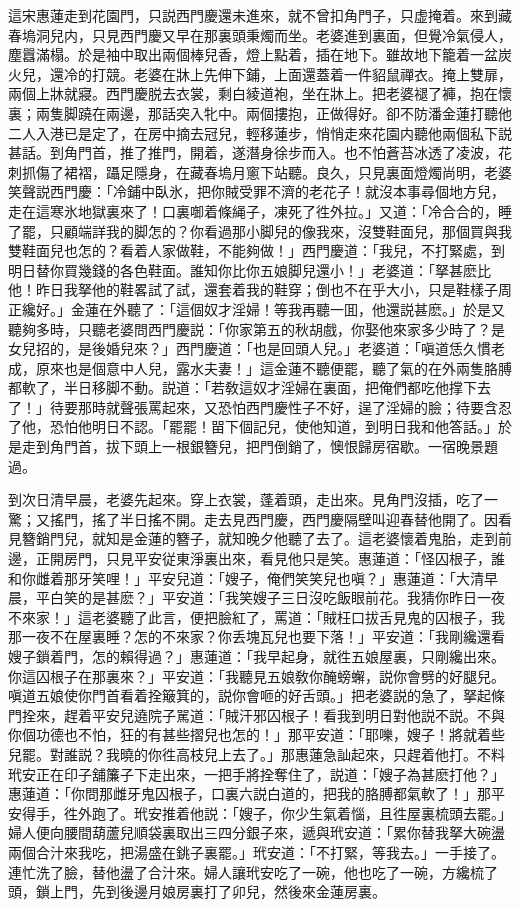 這宋惠蓮走到花園門，只説西門慶還未進來，就不曾扣角門子，只虚掩着。來到藏春塢洞兒内，只見西門慶又早在那裏頭秉燭而坐。老婆進到裏面，但覺冷氣侵人，塵囂滿榻。於是袖中取出兩個棒兒香，燈上點着，插在地下。雖故地下籠着一盆炭火兒，還冷的打競。老婆在牀上先伸下鋪，上面還蓋着一件貂鼠禪衣。掩上雙扉，兩個上牀就寢。西門慶脱去衣裳，剩白綾道袍，坐在牀上。把老婆褪了褲，抱在懷裏；兩隻脚蹺在兩邊，那話突入牝中。兩個摟抱，正做得好。卻不防潘金蓮打聽他二人入港已是定了，在房中摘去冠兒，輕移蓮步，悄悄走來花園内聽他兩個私下説甚話。到角門首，推了推門，開着，遂潛身徐步而入。也不怕蒼苔冰透了凌波，花刺抓傷了裙褶，躡足隱身，在藏春塢月窻下站聽。良久，只見裏面燈燭尚明，老婆笑聲説西門慶：「冷鋪中臥氷，把你賊受罪不濟的老花子！就沒本事尋個地方兒，走在這寒氷地獄裏來了！口裏啣着條䋲子，凍死了徃外拉。」又道：「冷合合的，睡了罷，只顧端詳我的脚怎的？你看過那小脚兒的像我來，沒雙鞋面兒，那個買與我雙鞋面兒也怎的？看着人家做鞋，不能夠做！」西門慶道：「我兒，不打緊處，到明日替你買幾錢的各色鞋面。誰知你比你五娘脚兒還小！」老婆道：「拏甚麽比他！昨日我拏他的鞋畧試了試，還套着我的鞋穿；倒也不在乎大小，只是鞋樣子周正纔好。」金蓮在外聽了：「這個奴才淫婦！等我再聽一囬，他還説甚麽。」於是又聽夠多時，只聽老婆問西門慶説：「你家第五的秋胡戲，你娶他來家多少時了？是女兒招的，是後婚兒來？」西門慶道：「也是回頭人兒。」老婆道：「嗔道恁久慣老成，原來也是個意中人兒，露水夫妻！」這金蓮不聽便罷，聽了氣的在外兩隻胳膊都軟了，半日移脚不動。説道：「若敎這奴才淫婦在裏面，把俺們都吃他撑下去了！」待要那時就聲張罵起來，又恐怕西門慶性子不好，逞了淫婦的臉；待要含忍了他，恐怕他明日不認。「罷罷！㽞下個記兒，使他知道，到明日我和他答話。」於是走到角門首，拔下頭上一根銀簪兒，把門倒銷了，懊恨歸房宿歇。一宿晚景題過。

到次日清早晨，老婆先起來。穿上衣裳，蓬着頭，走出來。見角門沒插，吃了一驚；又搖門，搖了半日搖不開。走去見西門慶，西門慶隔壁叫迎春替他開了。因看見簪銷門兒，就知是金蓮的簪子，就知晚夕他聽了去了。這老婆懷着鬼胎，走到前邊，正開房門，只見平安従東淨裏出來，看見他只是笑。惠蓮道：「怪囚根子，誰和你雌着那牙笑哩！」平安兒道：「嫂子，俺們笑笑兒也嗔？」惠蓮道：「大清早晨，平白笑的是甚麽？」平安道：「我笑嫂子三日沒吃飯眼前花。我猜你昨日一夜不來家！」這老婆聽了此言，便把臉紅了，罵道：「賊枉口拔舌見鬼的囚根子，我那一夜不在屋裏睡？怎的不來家？你丢塊瓦兒也要下落！」平安道：「我剛纔還看嫂子鎖着門，怎的賴得過？」惠蓮道：「我早起身，就徃五娘屋裏，只剛纔出來。你這囚根子在那裏來？」平安道：「我聽見五娘敎你醃螃蠏，説你會劈的好腿兒。嗔道五娘使你門首看着拴簸箕的，説你會咂的好舌頭。」把老婆説的急了，拏起條門拴來，趕着平安兒遶院子駡道：「賊汗邪囚根子！看我到明日對他説不説。不與你個功德也不怕，狂的有甚些摺兒也怎的！」那平安道：「耶嚛，嫂子！將就着些兒罷。對誰説？我曉的你徃高枝兒上去了。」那惠蓮急訕起來，只趕着他打。不料玳安正在印子舖簾子下走出來，一把手將拴奪住了，説道：「嫂子為甚麽打他？」惠蓮道：「你問那雌牙鬼囚根子，口裏六説白道的，把我的胳膊都氣軟了！」那平安得手，徃外跑了。玳安推着他説：「嫂子，你少生氣着惱，且徃屋裏梳頭去罷。」婦人便向腰間葫蘆兒順袋裏取出三四分銀子來，遞與玳安道：「累你替我拏大碗盪兩個合汁來我吃，把湯盛在銚子裏罷。」玳安道：「不打緊，等我去。」一手接了。連忙洗了臉，替他盪了合汁來。婦人讓玳安吃了一碗，他也吃了一碗，方纔梳了頭，鎖上門，先到後邊月娘房裏打了卯兒，然後來金蓮房裏。


